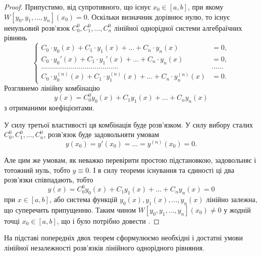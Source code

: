 \begin{proof}
	Припустимо, від супротивного, що існує $x_0 \in [a,b]$, при якому $W[y_0, y_1, \ldots, y_n](x_0) = 0$. Оскільки визначник дорівнює нулю, то існує ненульовий розв'язок $C_0^0, C_1^0, \ldots, C_n^0$ лінійної однорідної системи алгебраїчних рівнянь \begin{equation*}
		\left\{ \begin{aligned}
			C_0 \cdot y_0(x) + C_1 \cdot y_1(x) + \ldots + C_n \cdot y_n(x) &= 0, \\
			C_0 \cdot y_0'(x) + C_1 \cdot y_1'(x) + \ldots + C_n \cdot y_n(x) &= 0, \\
			\ldots \ldots \ldots \ldots \ldots \ldots \ldots \ldots \ldots \ldots \ldots \ldots \ldots & \ldots \ldots \\
			C_0 \cdot y_0^{(n)}(x) + C_1 \cdot y_1^{(n)}(x) + \ldots + C_n \cdot y_n^{(n)}(x) &= 0.
		\end{aligned} \right.
	\end{equation*}
	Розглянемо лінійну комбінацію 
	\begin{equation*}
		y(x) = C_0^0 y_0(x) + C_1 y_1(x) + \ldots + C_n y_n(x)
	\end{equation*}
	з отриманими коефіцієнтами. \parvskip

	У силу третьої властивості ця комбінація буде розв'язком. У силу вибору сталих $C_0^0, C_1^0, \ldots, C_n^0$, розв'язок буде задовольняти умовам
	\begin{equation*}
		y(x_0) = y'(x_0) = \ldots = y^{(n)}(x_0) = 0.
	\end{equation*}
 
	Але цим же умовам, як неважко перевірити простою підстановкою, задовольняє і тотожний нуль, тобто $y \equiv 0$. І в силу теореми існування та єдиності ці два розв'язки співпадають, тобто 
	\begin{equation*}
		y(x) = C_0^0 y_0(x) + C_1 y_1(x) + \ldots + C_n y_n(x) = 0
	\end{equation*}
	при $x \in [a,b]$, або система функцій $y_0(x), y_1(x), \ldots, y_n(x)$ лінійно залежна, що суперечить припущенню. Таким чином $W[y_0, y_1, \ldots, y_n](x_0) \ne 0$ у жодній точці $x_0 \in [a,b]$, що і було потрібно довести .
\end{proof}

На підставі попередніх двох теорем сформулюємо необхідні і достатні умови лінійної незалежності розв'язків лінійного однорідного рівняння.

